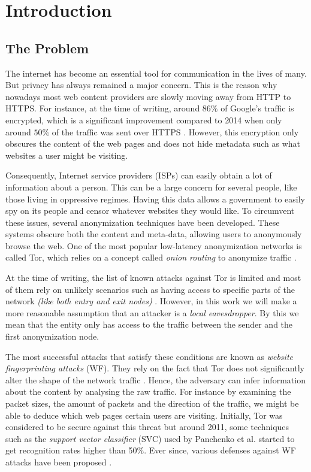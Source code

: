 \chapter{Introduction}

\section{The Problem}

The internet has become an essential tool for communication in the lives of many. But privacy has always remained a major concern.
This is the reason why nowadays most web content providers are slowly moving away from HTTP to HTTPS.
For instance, at the time of writing, around $86\%$ of Google's traffic is encrypted, which is a significant improvement compared to 2014 when only around $50\%$ of the traffic was sent over HTTPS \cite{google_transparancy}.
However, this encryption only obscures the content of the web pages and does not hide metadata such as what websites a user might be visiting.

Consequently, Internet service providers (ISPs) can easily obtain a lot of information about a person.
This can be a large concern for several people, like those living in oppressive regimes.
Having this data allows a government to easily spy on its people and censor whatever websites they would like.
To circumvent these issues, several anonymization techniques have been developed.
These systems obscure both the content and meta-data, allowing users to anonymously browse the web.
One of the most popular low-latency anonymization networks is called Tor, which relies on a concept called \textit{onion routing} to anonymize traffic \cite{tor_project}.

At the time of writing, the list of known attacks against Tor is limited and most of them rely on unlikely scenarios such as having access to specific parts of the network \textit{(like both entry and exit nodes)} \cite{tor_project}.
However, in this work we will make a more reasonable assumption that an attacker is a \textit{local eavesdropper}.
By this we mean that the entity only has access to the traffic between the sender and the first anonymization node.

The most successful attacks that satisfy these conditions are known as \textit{website fingerprinting attacks} (WF).
They rely on the fact that Tor does not significantly alter the shape of the network traffic \cite{kfingerprinting}.
Hence, the adversary can infer information about the content by analysing the raw traffic.
For instance by examining the packet sizes, the amount of packets and the direction of the traffic, we might be able to deduce
which web pages certain users are visiting.
Initially, Tor was considered to be secure against this threat but around 2011, some techniques such as the \textit{support vector classifier} (SVC) used by Panchenko et al. started to get recognition rates higher than 50\%.
Ever since, various defenses against WF attacks have been proposed \cite{panchenko1,perry2011experimental}.


